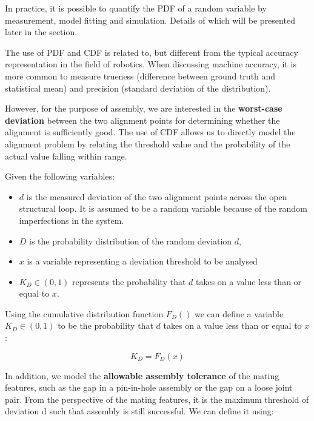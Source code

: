 In practice, it is possible to quantify the PDF of a random variable by measurement, model fitting and simulation. Details of which will be presented later in the section.



The use of PDF and CDF is related to, but different from the typical accuracy representation in the field of robotics. When discussing machine accuracy, it is more common to measure trueness (difference between ground truth and statistical mean) and precision (standard deviation of the distribution). 

However, for the purpose of assembly, we are interested in the \textbf{worst-case deviation }between the two alignment points for determining whether the alignment is sufficiently good. The use of CDF allows us to directly model the alignment problem by relating the threshold value and the probability of the actual value falling within range. 

Given the following variables: 

\begin{itemize}[nosep]
	\item $d$ is the measured deviation of the two alignment points across the open structural loop. It is assumed to be a random variable because of the random imperfections in the system. 

	\item $D$ is the probability distribution of the random deviation $d$, 

	\item $x$ is a variable representing a deviation threshold to be analysed 

	\item $K_D \in (0,1)$ represents the probability that $d$ takes on a value less than or equal to $x$. 

\end{itemize}

Using the cumulative distribution function $F_D ()$ we can define a variable $K_D \in (0,1)$ to be the probability that $d$ takes on a value less than or equal to $x$: 

\begin{equation}
    K_D = F_D (x)
\end{equation}

In addition, we model the \textbf{allowable assembly tolerance} of the mating features, such as the gap in a pin-in-hole assembly or the gap on a loose joint pair. From the perspective of the mating features, it is the maximum threshold of deviation d such that assembly is still successful. We can define it using: 

